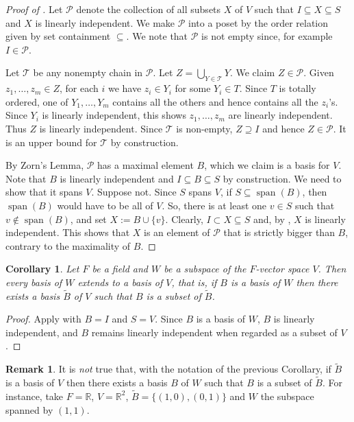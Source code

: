 \documentclass[12pt]{report}
\newtheorem{corollary}[theorem]{Corollary}
\numberwithin{equation}{section}
\numberwithin{theorem}{chapter}
\theoremstyle{definition}
\newtheorem*{basic properties}{Basic Properties}
\newtheorem*{Important Remark}{Important Remark}
\newtheorem{remark}[theorem]{Remark}
\newcommand{\R}{\mathbb{R}}
\DeclareMathOperator{\Span}{span}
\newcommand{\cP}{\mathcal{P}}
\newcommand{\cT}{\mathcal{T}}
\begin{document}
\begin{proof}[Proof of ]
Let $\cP$ denote the collection of all subsets $X$ of $V$ such that $I \subseteq X \subseteq S$ and $X$ is linearly independent. We make $\cP$ into a poset by the order relation given by set containment $\subseteq$. We note that $\cP$ is not empty since, for example $I \in \cP$. 

Let $\cT$ be any nonempty chain in $\cP$. Let $Z = \bigcup_{Y \in \cT} Y$. We claim $Z \in \cP$. Given  $z_1, \dots, z_m \in Z$, for each $i$ we have $z_i \in Y_i$ for some $Y_i \in T$. Since $T$ is totally ordered, one of $Y_1, \dots, Y_m$ contains all the others and hence contains all the $z_i$'s. 
Since $Y_i$ is linearly independent, this shows $z_1, \dots, z_m$ are linearly independent. Thus $Z$ is linearly independent. Since $\cT$ is non-empty, $Z \supseteq I$ and hence $Z \in \cP$. It is an upper bound for $\cT$ by construction. 

By Zorn's Lemma, $\cP$ has a maximal element $B$, which we claim is a basis for $V$. Note that $B$ is linearly independent and  $I \subseteq B \subseteq S$ by construction. We need to show that it spans $V$. Suppose not. Since $S$ spans $V$, if $S \subseteq \Span(B)$, then $\Span(B)$ would have to be all of $V$. So, there is at least one $v \in S$ such that $v \notin \Span(B)$, and set $X := B \cup \{v\}$.
Clearly, $I \subset X \subseteq S$ and, by , $X$ is linearly independent. This shows that $X$ is an element of $\cP$ that is strictly bigger than $B$, contrary to the maximality of $B$. 
\end{proof}




\begin{corollary}
Let $F$ be a field and $W$ be a subspace of the $F$-vector space $V$. Then every basis of $W$ extends to a basis of $V$, that is, if $B$ is a basis of $W$ then there exists a basis $\tilde{B}$ of $V$ such that $B$ is a subset of $\tilde{B}$.
\end{corollary}

\begin{proof} 
Apply  with $B = I$ and $S = V$. Since $B$ is a basis of $W$, $B$ is linearly independent, and  $B$ remains linearly independent when regarded as a subset of $V$.
\end{proof}

\begin{remark} 
It is {\em not} true that, with the notation of the previous Corollary, if $\tilde{B}$ is a basis of $V$ then there exists a basis $B$ of $W$ such that $B$ is a subset of $\tilde{B}$. For instance, take $F = \R$, $V = \R^2$, $\tilde{B} = \{(1,0), (0,1)\}$ and $W$ the subspace spanned by $(1,1)$. 
  \end{remark}
\end{document}
